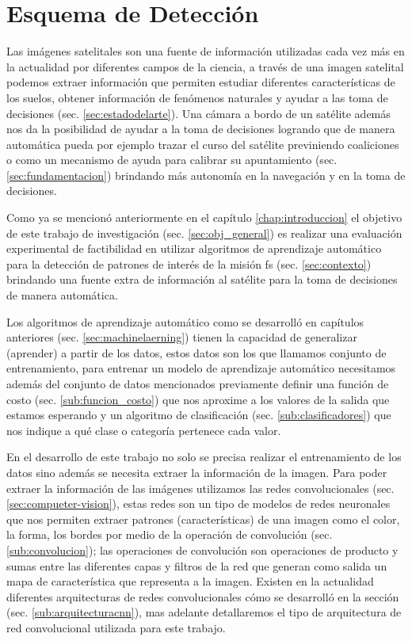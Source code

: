 \chapter{Esquema de Detección}\label{chap:tbd}

Las imágenes satelitales son una fuente de información utilizadas cada vez más en la actualidad por diferentes campos de la ciencia, a través de una imagen satelital podemos extraer información que permiten estudiar diferentes características de los suelos, obtener información de fenómenos naturales y ayudar a las toma de decisiones (sec. \ref{sec:estadodelarte}). Una cámara a bordo de un satélite además nos da la posibilidad de ayudar a la toma de decisiones logrando que de manera automática pueda por ejemplo trazar el curso del satélite previniendo coaliciones o como un mecanismo de ayuda para calibrar su apuntamiento (sec. \ref{sec:fundamentacion}) brindando más autonomía en la navegación y en la toma de decisiones. 

Como ya se mencionó anteriormente en el  capítulo \ref{chap:introduccion} el objetivo de este trabajo de investigación  (sec. \ref{sec:obj_general}) es realizar una evaluación experimental de factibilidad en utilizar algoritmos de aprendizaje automático para  la detección de patrones de interés de la misión \ac{fs} (sec. \ref{sec:contexto})  brindando una  fuente extra de información al satélite para la toma de decisiones de manera automática. 

Los algoritmos de aprendizaje automático como se desarrolló en capítulos anteriores (sec. \ref{sec:machinelaerning}) tienen la capacidad de generalizar (aprender)  a partir de los datos, estos datos son los que llamamos conjunto de entrenamiento, para entrenar un modelo de aprendizaje automático necesitamos además del conjunto de datos mencionados previamente definir una función de costo (sec. \ref{sub:funcion_costo}) que nos aproxime a los valores de la salida que estamos esperando y un algoritmo de clasificación (sec. \ref{sub:clasificadores}) que nos indique a qué clase o categoría pertenece cada valor. 

En el desarrollo de este trabajo no solo se precisa realizar el entrenamiento de los datos sino además se necesita extraer la información de la imagen. Para poder extraer la información de las imágenes utilizamos las redes convolucionales (sec. \ref{sec:compueter-vision}), estas redes son un tipo de modelos de redes neuronales que nos permiten extraer patrones (características) de una imagen como el color, la forma, los bordes por medio de la operación de convolución (sec. \ref{sub:convolucion}); las operaciones de convolución son operaciones de producto y sumas entre las diferentes capas y filtros de la red que generan como salida un mapa de característica que representa a la imagen. Existen en la actualidad diferentes arquitecturas de redes convolucionales cómo se desarrolló en la sección (sec. \ref{sub:arquitecturacnn}), mas adelante  detallaremos el tipo de arquitectura de red convolucional utilizada para este trabajo.


